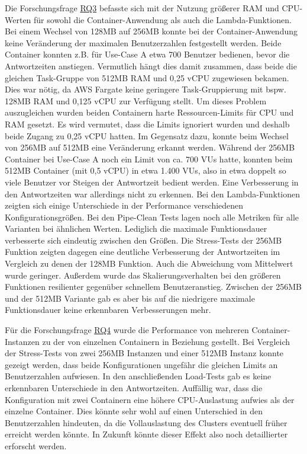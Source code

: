 Die Forschungsfrage \hyperref[tab:research-questions]{RQ3} befasste sich mit der Nutzung größerer RAM und CPU-Werten für sowohl die Container-Anwendung als auch die Lambda-Funktionen. Bei einem Wechsel von 128MB auf 256MB konnte bei der \linebreak Container-Anwendung keine Veränderung der maximalen Benutzerzahlen festgestellt werden. Beide Container konnten z.B. für Use-Case A etwa 700 Benutzer bedienen, bevor die Antwortzeiten anstiegen. Vermutlich hängt dies damit zusammen, dass beide die gleichen Task-Gruppe von 512MB RAM und 0,25 vCPU zugewiesen bekamen. Dies war nötig, da \ac{AWS} Fargate keine geringere Task-Gruppierung mit bspw. 128MB RAM und 0,125 vCPU zur Verfügung stellt. Um dieses Problem auszugleichen wurden beiden Containern harte Ressourcen-Limits für CPU und RAM gesetzt. Es wird vermutet, dass die Limits ignoriert wurden und deshalb beide Zugang zu 0,25 vCPU hatten. 
Im Gegensatz dazu, konnte beim Wechsel von 256MB auf 512MB eine Veränderung erkannt werden. Während der 256MB Container bei Use-Case A noch ein Limit von ca. 700 VUs hatte, konnten beim 512MB Container (mit 0,5 vCPU) in etwa 1.400 VUs, also in etwa doppelt so viele Benutzer vor Steigen der Antwortzeit bedient werden. Eine Verbesserung in den Antwortzeiten war allerdings nicht zu erkennen. 
Bei den Lambda-Funktionen zeigten sich einige Unterschiede in der Performance verschiedenen Konfigurationsgrößen. Bei den Pipe-Clean Tests lagen noch alle Metriken für alle Varianten bei ähnlichen Werten. Lediglich die maximale Funktionsdauer verbesserte sich eindeutig zwischen den Größen. Die Stress-Tests der 256MB Funktion zeigten dagegen eine deutliche Verbesserung der Antwortzeiten im Vergleich zu denen der 128MB Funktion. Auch die Abweichung vom Mittelwert wurde geringer. Außerdem wurde das Skalierungsverhalten bei den größeren Funktionen resilienter gegenüber schnellem Benutzeranstieg. Zwischen der 256MB und der 512MB Variante gab es aber bis auf die niedrigere maximale Funktionsdauer keine erkennbaren Verbesserungen mehr.

Für die Forschungsfrage \hyperref[tab:research-questions]{RQ4} wurde die Performance von mehreren \linebreak Container-Instanzen zu der von einzelnen Containern in Beziehung gestellt. Bei Vergleich der Stress-Tests von zwei 256MB Instanzen und einer 512MB Instanz konnte gezeigt werden, dass beide Konfigurationen ungefähr die gleichen Limits an Benutzerzahlen aufwiesen. In den anschließenden Load-Tests gab es keine erkennbaren Unterschiede in den Antwortzeiten. Auffällig war, dass die Konfiguration mit zwei Containern eine höhere CPU-Auslastung aufwies als der einzelne Container. Dies könnte sehr wohl auf einen Unterschied in den Benutzerzahlen hindeuten, da die Vollauslastung des Clusters eventuell früher erreicht werden könnte. In Zukunft könnte dieser Effekt also noch detaillierter erforscht werden.


